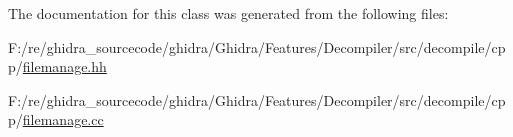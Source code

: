 The documentation for this class was generated from the following files\+:\begin{DoxyCompactItemize}
\item 
F\+:/re/ghidra\+\_\+sourcecode/ghidra/\+Ghidra/\+Features/\+Decompiler/src/decompile/cpp/\mbox{\hyperlink{filemanage_8hh}{filemanage.\+hh}}\item 
F\+:/re/ghidra\+\_\+sourcecode/ghidra/\+Ghidra/\+Features/\+Decompiler/src/decompile/cpp/\mbox{\hyperlink{filemanage_8cc}{filemanage.\+cc}}\end{DoxyCompactItemize}
